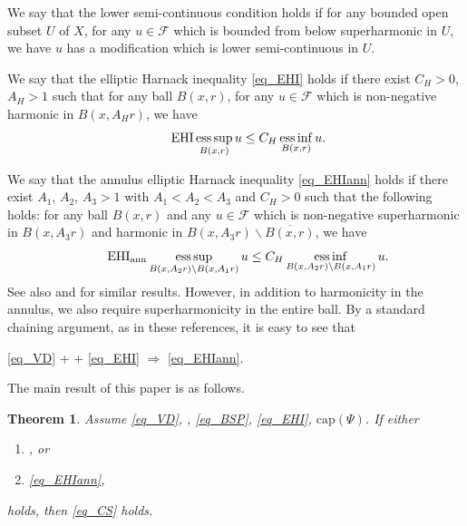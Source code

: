 \documentclass[11pt,a4paper]{article}
\numberwithin{equation}{section}
\newcommand{\esup}{\operatorname*{ess\,sup}}
\newcommand{\einf}{\operatorname*{ess\,inf}}
\theoremstyle{plain}
\newtheorem{theorem}{Theorem}[section]
\theoremstyle{definition}
\begin{document}
We say that the lower semi-continuous condition \hypertarget{eq_LSC}{} holds if for any bounded open subset $U$ of $X$, for any $u\in \mathcal{F}$ which is bounded from below superharmonic in $U$, we have $u$ has a modification which is lower semi-continuous in $U$.

We say that the elliptic Harnack inequality \ref{eq_EHI} holds if there exist $C_H>0$, $A_H>1$ such that for any ball $B(x,r)$, for any $u\in\mathcal{F}$ which is non-negative harmonic in $B(x,A_Hr)$, we have
\begin{equation*}\label{eq_EHI}\tag*{\text{EHI}}
\esup_{B(x,r)}u\le C_H\einf_{B(x,r)}u.
\end{equation*}

We say that the annulus elliptic Harnack inequality \ref{eq_EHIann} holds if there exist $A_1$, $A_2$, $A_3>1$ with $A_1<A_2<A_3$ and $C_H>0$ such that the following holds: for any ball $B(x,r)$ and any $u\in \mathcal{F}$ which is non-negative superharmonic in $B(x,A_3r)$ and harmonic in $B(x,A_3r)\backslash \overline{B(x,r)}$, we have
\begin{equation*}\label{eq_EHIann}\tag*{$\text{EHI}_{\text{ann}}$}
\esup_{B(x,A_2r)\backslash B(x,A_1r)}u\le C_H\einf_{B(x,A_2r)\backslash B(x,A_1r)}u.
\end{equation*}
See also \cite[Theorem 3.1]{Bla01} and \cite[LEMMA 6.3]{GS05} for similar results. However, in addition to harmonicity in the annulus, we also require superharmonicity in the entire ball. By a standard chaining argument, as in these references, it is easy to see that
\begin{center}
\ref{eq_VD} + \hyperlink{eq_LLC}{} + \ref{eq_EHI} $\Rightarrow$ \ref{eq_EHIann}.
\end{center}

The main result of this paper is as follows.

\begin{theorem}\label{thm_main}
Assume \ref{eq_VD}, \hyperlink{eq_LSC}{}, \ref{eq_BSP}, \ref{eq_EHI}, \hyperlink{eq_cap}{$\text{cap}(\Psi)$}. If either
\begin{enumerate}[label=(\alph*),ref=(\alph*)]
\item\label{cond_main_LLC} \hyperlink{eq_LLC}{}, or
\item\label{cond_main_EHIann} \ref{eq_EHIann},
\end{enumerate}
holds, then \ref{eq_CS} holds.
\end{theorem}
\end{document}
